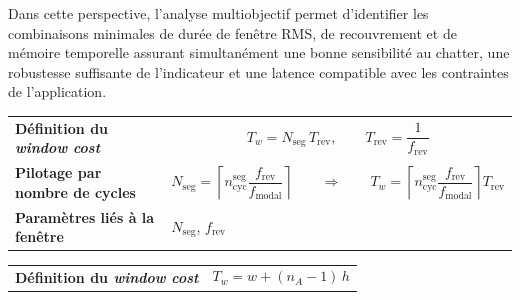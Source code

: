 \documentclass[12pt,a4paper, openany]{book}
\renewcommand{\arraystretch}{1.15}
\begin{document}
Dans cette perspective, l'analyse multiobjectif permet d'identifier les combinaisons minimales de durée de fenêtre RMS, de recouvrement et de mémoire temporelle assurant simultanément une bonne sensibilité au chatter, une robustesse suffisante de l'indicateur et une latence compatible avec les contraintes de l'application.

\begin{table}[htbp]
\centering
\renewcommand{\arraystretch}{1.35}

\begin{tcolorbox}[
    enhanced,
    colback=white,
    colframe=azul2,
    coltitle=white,
    colbacktitle=azul1,
    title={Synthèse des méthodes : définition et pilotage du \textit{window cost}},
    fonttitle=\normalfont\bfseries,
    arc=2mm,
    boxrule=0.9pt,
    drop shadow,
    width=\textwidth
]

\begin{tcolorbox}[
    enhanced,
    colback=azul1b,
    colframe=azul2,
    coltitle=white,
    colbacktitle=azul2,
    title={MaxEnt--SPRT},
    fonttitle=\normalfont\bfseries,
    arc=1.5mm,
    boxrule=0.7pt,
    width=\textwidth
]
\begin{tabular}{>{\raggedright\arraybackslash\bfseries}p{3.7cm}
                >{\raggedright\arraybackslash}p{10.5cm}}
Définition du \textit{window cost} &
\[
T_w = N_{\mathrm{seg}}\,T_{\mathrm{rev}},
\qquad
T_{\mathrm{rev}}=\frac{1}{f_{\mathrm{rev}}}
\]
\\[0.4em]

Pilotage par nombre de cycles &
\[
N_{\mathrm{seg}}
=
\left\lceil
n_{\mathrm{cyc}}^{\mathrm{seg}}
\frac{f_{\mathrm{rev}}}{f_{\mathrm{modal}}}
\right\rceil
\qquad \Rightarrow \qquad
T_w=
\left\lceil
n_{\mathrm{cyc}}^{\mathrm{seg}}
\frac{f_{\mathrm{rev}}}{f_{\mathrm{modal}}}
\right\rceil
T_{\mathrm{rev}}
\]
\\[0.4em]

Paramètres liés à la fenêtre &
$N_{\mathrm{seg}}$, $f_{\mathrm{rev}}$
\end{tabular}
\end{tcolorbox}

\vspace{0.6em}

\begin{tcolorbox}[
    enhanced,
    colback=azul1b,
    colframe=azul2,
    coltitle=white,
    colbacktitle=azul2,
    title={SST--SVD},
    fonttitle=\normalfont\bfseries,
    arc=1.5mm,
    boxrule=0.7pt,
    width=\textwidth
]
\begin{tabular}{>{\raggedright\arraybackslash\bfseries}p{3.7cm}
                >{\raggedright\arraybackslash}p{10.5cm}}
Définition du \textit{window cost} &
\[
T_w = w + (n_A-1)\,h
\]
\\[0.4em]


\end{tabular}
\end{tcolorbox}
\end{tcolorbox}
\end{table}
\end{document}
